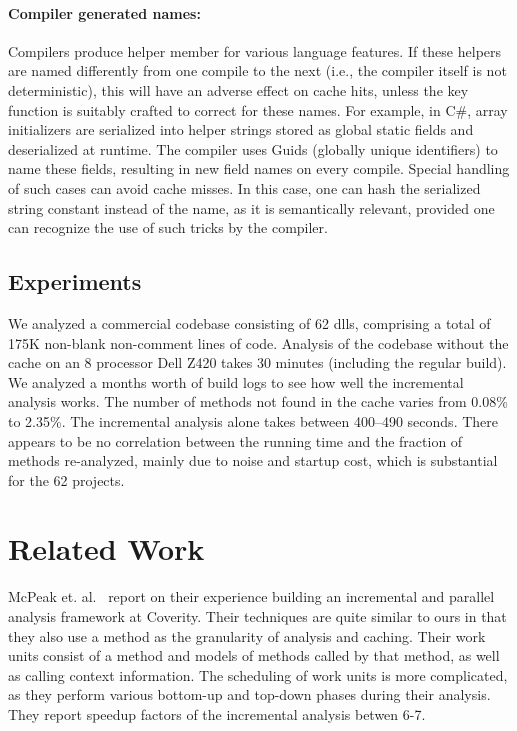 \documentclass{llncs}
\begin{document}
\paragraph{Compiler generated names:} Compilers produce helper member for
 various language features. If these helpers are named differently
 from one compile to the next (i.e., the compiler itself is not
 deterministic), this will have an adverse effect on cache hits,
 unless the key function is suitably crafted to correct for these
 names. For example, in C\#, array initializers are serialized into
 helper strings stored as global static fields and deserialized at
 runtime. The compiler uses Guids (globally unique identifiers) to
 name these fields, resulting in new field names on every compile.
 Special handling of such cases can avoid cache misses. In this case,
 one can hash the serialized string constant instead of the name, as
 it is semantically relevant, provided one can recognize the use of
 such tricks by the compiler.


\subsection{Experiments}
We analyzed a commercial codebase consisting of 62 dlls, comprising a
total of 175K non-blank non-comment lines of code. Analysis of the
codebase without the cache on an 8 processor Dell Z420 takes 30
minutes (including the regular build). We analyzed a months worth of
build logs to see how well the incremental analysis works. The number
of methods not found in the cache varies from 0.08\% to 2.35\%.  The
incremental analysis alone takes between 400--490 seconds. There
appears to be no correlation between the running time and the fraction
of methods re-analyzed, mainly due to noise and startup cost, which is
substantial for the 62 projects.



\section{Related Work}
McPeak et. al.~\cite{McPeak:2013} report on their experience building
an incremental and parallel analysis framework at Coverity. Their
techniques are quite similar to ours in that they also use a method as
the granularity of analysis and caching. Their work units consist of a
method and models of methods called by that method, as well as calling
context information. The scheduling of work units is more complicated,
as they perform various bottom-up and top-down phases during their
analysis. They report speedup factors of the incremental analysis betwen 6-7. 
\end{document}
